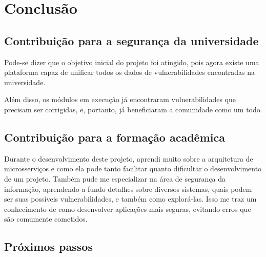 \chapter{Conclusão}
\label{cap:conclusao}

\section{Contribuição para a segurança da universidade}

Pode-se dizer que o objetivo inicial do projeto foi atingido, pois agora existe uma plataforma capaz de unificar todos os dados de vulnerabilidades encontradas na universidade.

Além disso, os módulos em execução já encontraram vulnerabilidades que precisam ser corrigidas, e, portanto, já beneficiaram a comunidade como um todo.


\section{Contribuição para a formação acadêmica}

Durante o desenvolvimento deste projeto, aprendi muito sobre a arquitetura de microsserviços e como ela pode tanto facilitar quanto dificultar o desenvolvimento de um projeto. 
Também pude me especializar na área de segurança da informação, aprendendo a fundo detalhes sobre diversos sistemas, quais podem ser suas possíveis vulnerabilidades, e também como explorá-las. Isso me traz um conhecimento de como desenvolver aplicações mais seguras, evitando erros que são comumente cometidos.





\section{Próximos passos}

